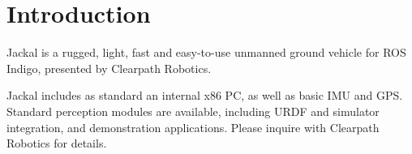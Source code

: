 \documentclass[]{article}
\begin{document}
\thispagestyle{empty}

\tableofcontents

\section{Introduction}

Jackal is a rugged, light, fast and easy-to-use unmanned ground vehicle for ROS Indigo, presented
by Clearpath Robotics.

Jackal includes as standard an internal x86 PC, as well as basic IMU and GPS. Standard perception
modules are available, including URDF and simulator integration, and demonstration applications.
Please inquire with Clearpath Robotics for details.
\end{document}
